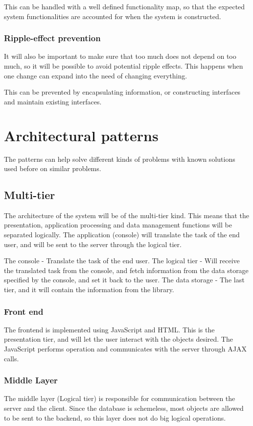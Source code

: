 This can be handled with a well defined functionality map, so that the expected system functionalities are accounted for when the system is constructed.

\subsubsection{Ripple-effect prevention}
It will also be important to make sure that too much does not depend on too much, so it will be possible to avoid potential ripple effects. This happens when one change can expand into the need of changing everything.

This can be prevented by encapsulating information, or constructing interfaces and maintain existing interfaces.


\section{Architectural patterns} \label{Architectural patterns}
The patterns can help solve different kinds of problems with known solutions used before on similar problems.

\subsection{Multi-tier}
The architecture of the system will be of the multi-tier kind. This means that the presentation, application processing and data management functions will be separated logically. The application (console) will translate the task of the end user, and will be sent to the server through the logical tier.

The console - Translate the task of the end user.
The logical tier - Will receive the translated task from the console, and fetch information from the data storage specified by the console, and set it back to the user.
The data storage - The last tier, and it will contain the information from the library.

\subsubsection{Front end}
The frontend is implemented using JavaScript and HTML. This is the presentation tier, and will let the user interact with the objects desired. The JavaScript performs operation and communicates with the server through AJAX calls.

\subsubsection{Middle Layer}
The middle layer (Logical tier) is responsible for communication between the server and the client. Since the database is schemeless, most objects are allowed to be sent to the backend, so this layer does not do big logical operations.

